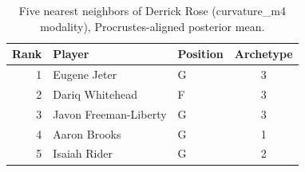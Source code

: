 \begin{table}[htbp]
  \centering\small
  \begin{tabular}{rllc}
    \toprule
    Rank & Player & Position & Archetype \\
    \midrule
    1 & Eugene Jeter & G & 3 \\
    2 & Dariq Whitehead & F & 3 \\
    3 & Javon Freeman-Liberty & G & 3 \\
    4 & Aaron Brooks & G & 1 \\
    5 & Isaiah Rider & G & 2 \\
    \bottomrule
  \end{tabular}
  \caption{Five nearest neighbors of Derrick Rose (curvature_m4 modality), Procrustes-aligned posterior mean.}
  \label{tab:Derrick_Rose_neighbors_curvature_m4}
\end{table}

